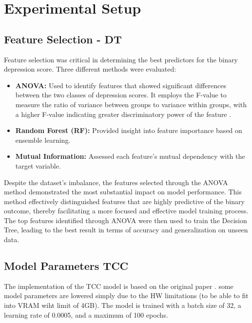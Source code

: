 \section{Experimental Setup}
\subsection{Feature Selection - DT}

Feature selection was critical in determining the best predictors for the binary depression score. Three different methods were evaluated:

\begin{itemize}
    \item \textbf{ANOVA:} Used to identify features that showed significant differences between the two classes of depression scores. It employs the F-value to measure the ratio of variance between groups to variance within groups, with a higher F-value indicating greater discriminatory power of the feature \cite{Minitab_ANOVA}.
    \item \textbf{Random Forest (RF):} Provided insight into feature importance based on ensemble learning.
    \item \textbf{Mutual Information:} Assessed each feature's mutual dependency with the target variable.
\end{itemize}

Despite the dataset's imbalance, the features selected through the ANOVA method demonstrated the most substantial impact on model performance. This method effectively distinguished features that are highly predictive of the binary outcome, thereby facilitating a more focused and effective model training process. The top features identified through ANOVA were then used to train the Decision Tree, leading to the best result in terms of accuracy and generalization on unseen data.

\subsection{Model Parameters TCC}

The implementation of the TCC model is based on the original paper \cite{yin2023depression}. some model parameters are lowered simply due to the HW limitations (to be able to fit into VRAM wiht limit of 4GB). The model is trained with a batch size of 32, a learning rate of 0.0005, and a maximum of 100 epochs.

